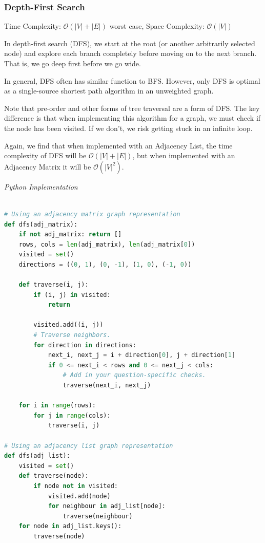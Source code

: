 \documentclass{article}
\newcommand{\bigO}{\mathcal{O}}
\begin{document}
    \subsubsection{Depth-First Search }
    Time Complexity: $\bigO(|V| + |E|)$ worst case, Space Complexity: $\bigO(|V|)$
    
    In depth-first search (DFS), we start at the root (or another arbitrarily selected node) and explore each branch completely before moving on to the next branch. That is, we go deep first before we go wide. 
    
    In general, DFS often has similar function to BFS. However, only DFS is optimal as a single-source shortest path algorithm in an unweighted graph.
    
    Note that pre-order and other forms of tree traversal are a form of DFS. The key difference is that when implementing this algorithm for a graph, we must check if the node has been visited. If we don't, we risk getting stuck in an infinite loop. 
    
    Again, we find that when implemented with an Adjacency List, the time complexity of DFS will be $\bigO(|V| + |E|)$, but when implemented with an Adjacency Matrix it will be $\bigO(|V|^2)$.
    
\vspace{8pt} \emph{Python Implementation}
\begin{lstlisting}[language=Python]

# Using an adjacency matrix graph representation
def dfs(adj_matrix):
    if not adj_matrix: return []
    rows, cols = len(adj_matrix), len(adj_matrix[0])
    visited = set()
    directions = ((0, 1), (0, -1), (1, 0), (-1, 0))

    def traverse(i, j):
        if (i, j) in visited:
            return

        visited.add((i, j))
        # Traverse neighbors.
        for direction in directions:
            next_i, next_j = i + direction[0], j + direction[1]
            if 0 <= next_i < rows and 0 <= next_j < cols:
                # Add in your question-specific checks.
                traverse(next_i, next_j)

    for i in range(rows):
        for j in range(cols):
            traverse(i, j)

# Using an adjacency list graph representation
def dfs(adj_list):
    visited = set()
    def traverse(node):
        if node not in visited:
            visited.add(node)
            for neighbour in adj_list[node]:
                traverse(neighbour)
    for node in adj_list.keys():
        traverse(node)
\end{lstlisting}
\end{document}
